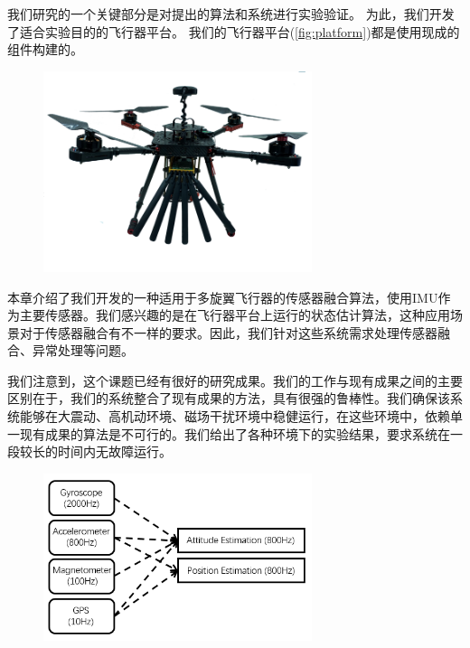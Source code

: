 \documentclass[
  type=master
]{gdutthesis}
\begin{document}
我们研究的一个关键部分是对提出的算法和系统进行实验验证。
为此，我们开发了适合实验目的的飞行器平台。
我们的飞行器平台(\autoref{fig:platform})都是使用现成的组件构建的。
\begin{figure}[htbp]
	\centering
	\includegraphics[width=0.7\textwidth]{platform.png}
	\label{fig:platform}
\end{figure} 

本章介绍了我们开发的一种适用于多旋翼飞行器的传感器融合算法，使用IMU作为主要传感器。我们感兴趣的是在飞行器平台上运行的状态估计算法，这种应用场景对于传感器融合有不一样的要求。因此，我们针对这些系统需求处理传感器融合、异常处理等问题。

我们注意到，这个课题已经有很好的研究成果\cite{mahony2008nonlinear,hua2010attitude,khosravian2016state}。我们的工作与现有成果之间的主要区别在于，我们的系统整合了现有成果的方法，具有很强的鲁棒性。我们确保该系统能够在大震动、高机动环境、磁场干扰环境中稳健运行，在这些环境中，依赖单一现有成果的算法是不可行的。我们给出了各种环境下的实验结果，要求系统在一段较长的时间内无故障运行。
\begin{figure}[htbp]
	\centering
	\includegraphics[width=0.7\textwidth]{state estimation.png}
	\label{fig:stateestimation}
\end{figure} 
\end{document}
